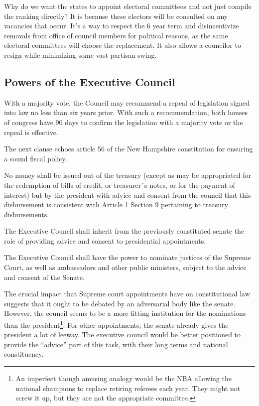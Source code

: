 \documentclass{article}
\begin{document}
Why do we want the states to appoint electoral committees and not just compile the ranking directly? It is because these electors will be consulted on any vacancies that occur. It’s a way to respect the 6 year term and disincentivize removals from office of council members for political reasons, as the same electoral committees will choose the replacement. It also allows a councilor to resign while minimizing some vast partisan swing.

\subsection{Powers of the Executive Council}

\begin{quoting}
With a majority vote, the Council may recommend a repeal of legislation signed into law no less than six years prior. With such a recommendation, both houses of congress have 90 days to confirm the legislation with a majority vote or the repeal is effective.
\end{quoting}

The next clause echoes article 56 of the New Hampshire constitution\cite{New Hampshire Constitution} for ensuring a sound fiscal policy.

\begin{quoting}
No money shall be issued out of the treasury (except as may be appropriated for the redemption of bills of credit, or treasurer´s notes, or for the payment of interest) but by the president with advice and consent from the council that this disbursement is consistent with Article 1 Section 9 pertaining to treasury disbursements.

The Executive Council shall inherit from the previously constituted senate the role of providing advice and consent to presidential appointments.

The Executive Council shall have the power to nominate justices of the Supreme Court, as well as ambassadors and other public ministers, subject to the advice and consent of the Senate.
\end{quoting}

The crucial impact that Supreme court appointments have on constitutional law suggests that it ought to be debated by an adversarial body like the senate. However, the council seems to be a more fitting institution for the nominations than the president\footnote{An imperfect though amusing analogy would be the NBA allowing the national champions to replace retiring referees each year. They might not screw it up, but they are not the appropriate committee.}. For other appointments, the senate already gives the president a lot of leeway. The executive council would be better positioned to provide the “advice” part of this task, with their long terms and national constituency.
\end{document}
